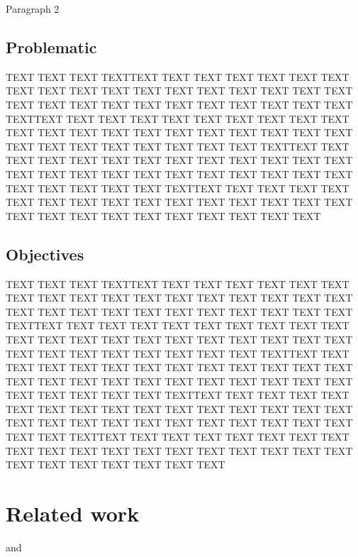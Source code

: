 \documentclass[10pt,conference,letterpaper]{IEEEtran}
\begin{document}
\par 
Paragraph 2 

\subsection{Problematic}
%
\par 
TEXT TEXT TEXT TEXTTEXT TEXT TEXT TEXT  TEXT TEXT  TEXT TEXT  TEXT TEXT  TEXT TEXT  TEXT TEXT  TEXT TEXT  TEXT TEXT  TEXT TEXT  TEXT TEXT  TEXT TEXT  TEXT TEXT 
TEXT TEXT TEXT TEXTTEXT TEXT TEXT TEXT  TEXT TEXT  TEXT TEXT  TEXT TEXT  TEXT TEXT  TEXT TEXT  TEXT TEXT  TEXT TEXT  TEXT TEXT  TEXT TEXT  TEXT TEXT  TEXT TEXT 
TEXT TEXT TEXT TEXTTEXT TEXT TEXT TEXT  TEXT TEXT  TEXT TEXT  TEXT TEXT  TEXT TEXT  TEXT TEXT  TEXT TEXT  TEXT TEXT  TEXT TEXT  TEXT TEXT  TEXT TEXT  TEXT TEXT 
TEXT TEXT TEXT TEXTTEXT TEXT TEXT TEXT  TEXT TEXT  TEXT TEXT  TEXT TEXT  TEXT TEXT  TEXT TEXT  TEXT TEXT  TEXT TEXT  TEXT TEXT  TEXT TEXT  TEXT TEXT  TEXT TEXT 

\subsection{Objectives}
%
\par 
TEXT TEXT TEXT TEXTTEXT TEXT TEXT TEXT  TEXT TEXT  TEXT TEXT  TEXT TEXT  TEXT TEXT  TEXT TEXT  TEXT TEXT  TEXT TEXT  TEXT TEXT  TEXT TEXT  TEXT TEXT  TEXT TEXT 
TEXT TEXT TEXT TEXTTEXT TEXT TEXT TEXT  TEXT TEXT  TEXT TEXT  TEXT TEXT  TEXT TEXT  TEXT TEXT  TEXT TEXT  TEXT TEXT  TEXT TEXT  TEXT TEXT  TEXT TEXT  TEXT TEXT 
TEXT TEXT TEXT TEXTTEXT TEXT TEXT TEXT  TEXT TEXT  TEXT TEXT  TEXT TEXT  TEXT TEXT  TEXT TEXT  TEXT TEXT  TEXT TEXT  TEXT TEXT  TEXT TEXT  TEXT TEXT  TEXT TEXT 
TEXT TEXT TEXT TEXTTEXT TEXT TEXT TEXT  TEXT TEXT  TEXT TEXT  TEXT TEXT  TEXT TEXT  TEXT TEXT  TEXT TEXT  TEXT TEXT  TEXT TEXT  TEXT TEXT  TEXT TEXT  TEXT TEXT 
TEXT TEXT TEXT TEXTTEXT TEXT TEXT TEXT  TEXT TEXT  TEXT TEXT  TEXT TEXT  TEXT TEXT  TEXT TEXT  TEXT TEXT  TEXT TEXT  TEXT TEXT  TEXT TEXT  TEXT TEXT  TEXT TEXT 



\section{Related work}

\par  \cite{reference-1} and \cite{reference-2} 
% 
\end{document}
